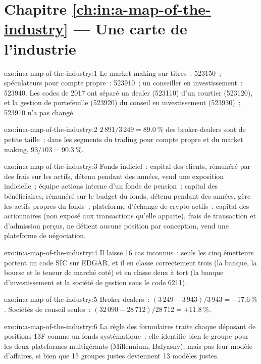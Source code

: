 \section*{Chapitre \ref{ch:in:a-map-of-the-industry} --- Une carte de l'industrie}

\begin{solution}{exo:in:a-map-of-the-industry:1}
Le market making sur titres~: 523150~; spéculateurs pour compte propre~: 523910~; un conseiller en investissement~: 523940. Les codes de 2017
ont séparé un dealer (523110) d'un courtier (523120), et la gestion de portefeuille (523920) du conseil en investissement (523930)~;
523910 n'a pas changé.
\end{solution}

\begin{solution}{exo:in:a-map-of-the-industry:2}
$2\,891/3\,249=89.0~\%$ des broker-dealers sont de petite taille~; dans les segments du trading pour compte propre et du market making, $93/103=90.3~\%$.
\end{solution}

\begin{solution}{exo:in:a-map-of-the-industry:3}
Fonds indiciel~: capital des clients, rémunéré par des frais sur les actifs, détenu pendant des années, vend une exposition indicielle~; équipe actions interne
d'un fonds de pension~: capital des bénéficiaires, rémunéré sur le budget du fonds, détenu pendant des années, gère les actifs propres du fonds~; plateforme
d'échange de crypto-actifs~: capital des actionnaires (non exposé aux transactions qu'elle apparie), frais de transaction et d'admission perçus, ne détient aucune position
par conception, vend une plateforme de négociation.
\end{solution}

\begin{solution}{exo:in:a-map-of-the-industry:4}
Il laisse 16 cas inconnus~: seuls les cinq émetteurs portent un code SIC sur EDGAR, et il en classe correctement trois (la banque, la
bourse et le teneur de marché coté) et en classe deux à tort (la banque d'investissement et la société de gestion sous le code 6211).
\end{solution}

\begin{solution}{exo:in:a-map-of-the-industry:5}
Broker-dealers~: $(3\,249-3\,943)/3\,943=-17.6~\%$. Sociétés de conseil seules~: $(32\,090-28\,712)/28\,712=+11.8~\%$.
\end{solution}

\begin{solution}{exo:in:a-map-of-the-industry:6}
La règle des formulaires traite chaque déposant de positions 13F comme un fonds systématique~: elle identifie bien le groupe pour les deux
plateformes multigérants (Millennium, Balyasny), mais pas leur modèle d'affaires, si bien que 15 groupes justes deviennent 13 modèles justes.
\end{solution}

